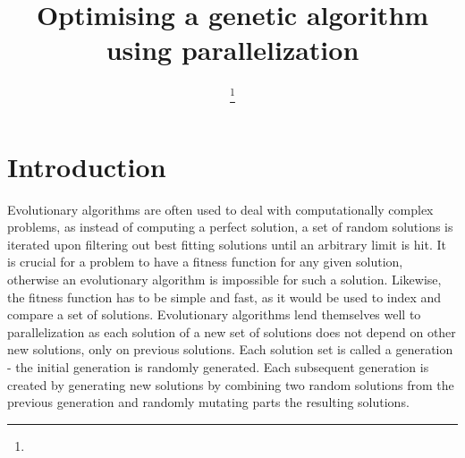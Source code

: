 \documentclass[journal,transmag]{IEEEtran}
\begin{document}
\title{Optimising a genetic algorithm using parallelization}

\author{

\thanks{}}





\maketitle

\IEEEdisplaynontitleabstractindextext

\IEEEpeerreviewmaketitle

\section{Introduction}


        Evolutionary algorithms \cite{evol} are often used to deal with computationally complex problems,
        as instead of computing a perfect solution, a set of random solutions is iterated upon
        filtering out best fitting solutions until an arbitrary limit is hit. It is crucial for
        a problem to have a fitness function for any given solution, otherwise an evolutionary
        algorithm is impossible for such a solution. Likewise, the fitness function has to be
        simple and fast, as it would be used to index and compare a set of solutions. Evolutionary
        algorithms lend themselves well to parallelization as each solution of a new set of solutions
        does not depend on other new solutions, only on previous solutions. Each solution set is called
        a generation - the initial generation is randomly generated. Each subsequent generation
        is created by generating new solutions by combining two random solutions from the previous
        generation and randomly mutating parts the resulting solutions.
        
\end{document}
